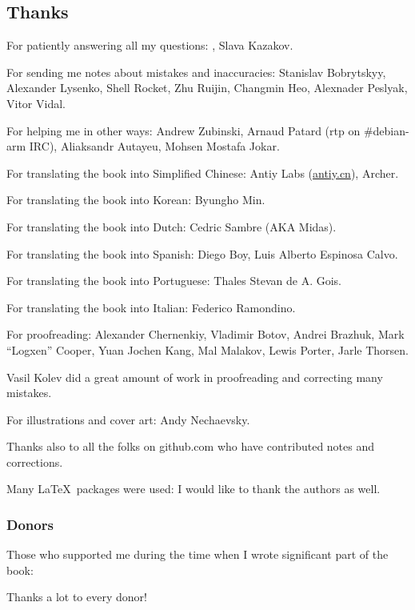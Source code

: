 \subsection*{Thanks}

For patiently answering all my questions: \HERMIT, Slava  Kazakov.

For sending me notes about mistakes and inaccuracies:
Stanislav  Bobrytskyy, Alexander Lysenko,
Shell Rocket, Zhu Ruijin, Changmin Heo, Alexnader  Peslyak, Vitor Vidal.

For helping me in other ways:
Andrew Zubinski,
Arnaud Patard (rtp on \#debian-arm IRC),
Aliaksandr Autayeu,
Mohsen Mostafa Jokar.

For translating the book into Simplified Chinese:
Antiy Labs (\href{http://antiy.cn}{antiy.cn}), Archer.

For translating the book into Korean: Byungho Min.

For translating the book into Dutch: Cedric Sambre (AKA Midas).

For translating the book into Spanish: Diego Boy, Luis Alberto Espinosa Calvo.

For translating the book into Portuguese: Thales Stevan de A. Gois.

For translating the book into Italian: Federico Ramondino.

For proofreading:
Alexander  Chernenkiy,
Vladimir Botov,
Andrei Brazhuk,
Mark ``Logxen'' Cooper, Yuan Jochen Kang, Mal Malakov, Lewis Porter, Jarle Thorsen.

Vasil Kolev did a great amount of work in proofreading and correcting many mistakes.

For illustrations and cover art: Andy Nechaevsky.

Thanks also to all the folks on github.com who have contributed notes and corrections.

Many \LaTeX\ packages were used: I would like to thank the authors as well.

\subsubsection*{Donors}

Those who supported me during the time when I wrote significant part of the book:



Thanks a lot to every donor!
